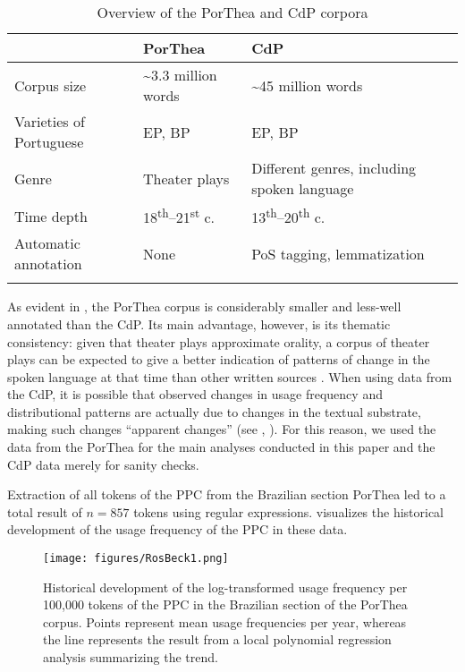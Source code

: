 \documentclass[output=paper,colorlinks,citecolor=brown]{langscibook}
\begin{document}
\begin{table}[h]
\begin{tabularx}{\textwidth}{llQ}
\lsptoprule
 & PorThea & CdP \\
\midrule
Corpus size & \textasciitilde3.3 million words & \textasciitilde45 million words \\
\tablevspace
Varieties of Portuguese & EP, BP & EP, BP \\
\tablevspace
Genre & Theater plays & Different genres, including spoken language \\
\tablevspace
Time depth & 18\textsuperscript{th}--21\textsuperscript{st} c. & 13\textsuperscript{th}--20\textsuperscript{th} c. \\
\tablevspace
Automatic annotation & None & PoS tagging, lemmatization\\
\lspbottomrule
\end{tabularx}
\caption{Overview of the PorThea and CdP corpora}
\label{tab:rb1}
\end{table}

As evident in , the PorThea corpus is considerably smaller and less-well annotated than the CdP. Its main advantage, however, is its thematic consistency: given that theater plays approximate orality, a corpus of theater plays can be expected to give a better indication of patterns of change in the spoken language at that time than other written sources \parencite[432]{Kytö2011}. When using data from the CdP, it is possible that observed changes in usage frequency and distributional patterns are actually due to changes in the textual substrate, making such changes “apparent changes” (see \citeauthor{Szmrecsanyi2016} \citeyear{Szmrecsanyi2016}, \citeauthor{Rosemeyer2019a} \citeyear{Rosemeyer2019a}). For this reason, we used the data from the PorThea for the main analyses conducted in this paper and the CdP data merely for sanity checks.

Extraction of all tokens of the PPC from the Brazilian section PorThea led to a total result of $n = 857$ tokens using regular expressions.  visualizes the historical development of the usage frequency of the PPC in these data. 

\begin{figure}
\texttt{[image: figures/RosBeck1.png]}
\caption{Historical development of the log-transformed usage frequency per 100,000 tokens of the PPC in the Brazilian section of the PorThea corpus. Points represent mean usage frequencies per year, whereas the line represents the result from a local polynomial regression analysis summarizing the trend.}
\label{fig:rb1}
\end{figure}
\end{document}
